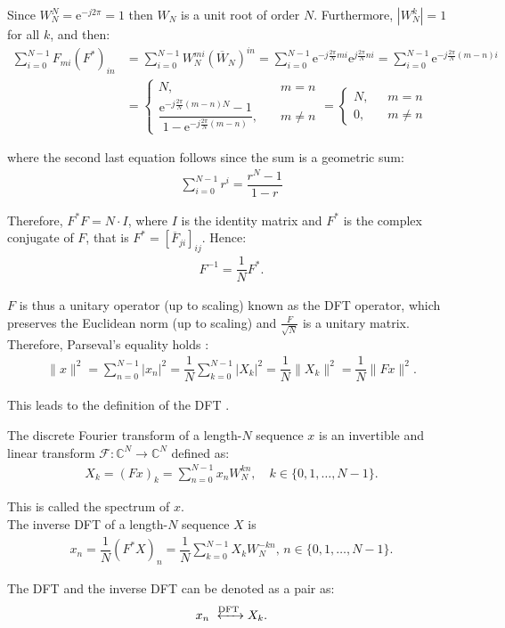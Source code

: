 Since $W_N^N = \text{e}^{-j2\pi} = 1$ then $W_N$ is a unit root of order $N$. Furthermore, $|W_N^k| = 1$ for all $k$, and then:
\begin{align*}
\sum_{i=0}^{N-1} F_{mi} (F^*)_{in} &= \sum_{i=0}^{N-1} W_N^{mi} (\overline{W}_N)^{in} = \sum_{i=0}^{N-1} \text{e}^{-j\frac{2\pi}{N}mi} \text{e}^{j\frac{2\pi}{N}ni} = \sum_{i=0}^{N-1} \text{e}^{-j\frac{2\pi}{N}(m-n)i} \\ &=
\begin{cases}
N, &m = n \\
\dfrac{\text{e}^{-j\frac{2\pi}{N}(m-n)N}-1}{1-\text{e}^{-j\frac{2\pi}{N}(m-n)}}, \quad &m \neq n
\end{cases} =
\begin{cases}
N, &m = n \\
0, \quad &m \neq n
\end{cases}
\end{align*}

where the second last equation follows since the sum is a geometric sum:
\begin{align*}
\sum_{i=0}^{N-1} r^i = \dfrac{r^N-1}{1-r}
\end{align*}

Therefore, $F^*F = N \cdot I$, where $I$ is the identity matrix and $F^*$ is the complex conjugate of $F$, that is $F^* = [\overline{F}_{ji}]_{ij}$. Hence:
\begin{align*}
F^{-1} = \dfrac{1}{N} F^*.
\end{align*}

$F$ is thus a unitary operator (up to scaling) known as the DFT operator, which preserves the Euclidean norm (up to scaling) and $\frac{F}{\sqrt{N}}$ is a unitary matrix. Therefore, Parseval's equality holds \cite{page 258, FSP}:
\begin{align*}
\|x\|^2 = \sum_{n=0}^{N-1} |x_n|^2 = \dfrac{1}{N} \sum_{k=0}^{N-1} |X_k|^2 = \dfrac{1}{N} \|X_k\|^2 = \dfrac{1}{N} \|Fx\|^2.
\end{align*}

This leads to the definition of the DFT \cite{page 253, FSP}.

\begin{definition}
The discrete Fourier transform of a length-$N$ sequence $x$ is an invertible and linear transform $\mathcal{F}: \mathbb{C}^N \to \mathbb{C}^N$ defined as:
\begin{align} \label{eq:def_DFT}
	X_k = (Fx)_k = \sum_{n=0}^{N-1} x_n W_N^{kn}, \quad k\in \{0, 1, \dots, N-1\}.
\end{align}

This is called the spectrum of $x$. \\
The inverse DFT of a length-$N$ sequence $X$ is
\begin{align*}
	x_n = \dfrac{1}{N}(F^*X)_n = \dfrac{1}{N}\sum_{k=0}^{N-1} X_k W_N^{-kn}, \, n \in \{0,1,\dots,N-1\}.
\end{align*}

The DFT and the inverse DFT can be denoted as a pair as:
\begin{align*}
	x_n \xleftrightarrow{\text{DFT}} X_k.
\end{align*}
\end{definition}

